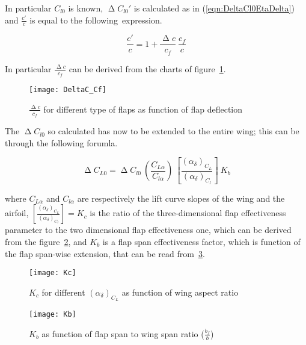 \noindent
In particular $C_{l0}$ is known, $\upDelta C_{l0}'$ is calculated as in (\ref{eqn:DeltaCl0EtaDelta}) and $\frac{c'}{c}$ is equal to the following~expression.

\begin{equation}
\frac{c'}{c}=1+\frac{\upDelta c}{c_f}\ \frac{c_f}{c}
\label{eqn:c'/c}
\end{equation}

\noindent
In particular $\frac{\upDelta c}{c_f}$ can be derived from the charts of figure~\ref{fig:DeltaCCf}.

\begin{figure}[!t]
  \centering
  \texttt{[image: DeltaC\_Cf]}
  \caption{$\frac{\upDelta c}{c_f}$ for different type of flaps as function of flap deflection}
  \label{fig:DeltaCCf}
\end{figure}

\noindent
The $\upDelta C_{l0}$ so calculated has now to be extended to the entire wing; this can be through the following forumla.

\begin{equation}
\upDelta C_{L0}=\upDelta C_{l0}\ \left(\frac{C_{L\alpha}}{C_{l\alpha}}\right)\ \left[\frac{\left(\alpha_\delta\right)_{C_{L}}}{\left(\alpha_\delta\right)_{C_{l}}}\right]\ K_b
\label{eqn:c'/c}
\end{equation}

\noindent
where $C_{L\alpha}$ and $C_{l\alpha}$ are respectively the lift curve slopes of the wing and the airfoil, $\left[\frac{\left(\alpha_\delta\right)_{C_{L}}}{\left(\alpha_\delta\right)_{C_{l}}}\right]=K_c$ is the ratio of the three-dimensional flap effectiveness parameter to the two dimensional flap effectiveness one, which can be derived from the figure~\ref{fig:Kc}, and $K_b$ is a flap span effectiveness factor, which is function of the flap span-wise extension, that can be  read from~\ref{fig:Kb}.

\begin{figure}[!b]
  \centering
  \texttt{[image: Kc]}
  \caption{$K_c$ for different $\left(\alpha_\delta\right)_{C_{L}}$ as function of wing aspect ratio}
  \label{fig:Kc}
\end{figure}

\begin{figure}[!t]
  \centering
  \texttt{[image: Kb]}
  \caption{$K_b$ as function of flap span to wing span ratio ($\frac{b_f}{b}$)}
  \label{fig:Kb}
\end{figure}

